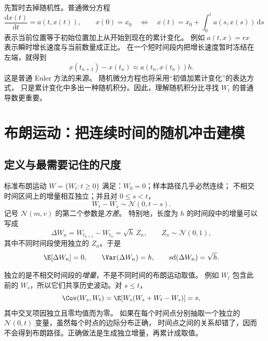 先暂时去掉随机性。普通微分方程
\begin{equation}
  \frac{\mathrm dx(t)}{\mathrm dt}=a(t,x(t)),\qquad x(0)=x_0
  \quad\Longleftrightarrow\quad
  x(t)=x_0+\int_0^t a(s,x(s))\,\mathrm ds
  \label{bg:eq:ode}
\end{equation}
表示当前位置等于初始位置加上从开始到现在的累计变化。
例如 $a(t,x)=rx$ 表示瞬时增长速度与当前数量成正比。
在一个短时间段内把增长速度暂时冻结在左端，就得到
\begin{equation}
  x(t_{n+1})-x(t_n)\approx a(t_n,x(t_n))h.
  \label{bg:eq:ode-euler}
\end{equation}
这是普通 Euler 方法的来源。
随机微分方程也将采用“初值加累计变化”的表达方式，
只是累计变化中多出一种随机积分。因此，理解随机积分比寻找 $W_t$ 的普通导数更重要。

\section{布朗运动：把连续时间的随机冲击建模}
\label{bg:sec:brownian}

\subsection{定义与最需要记住的尺度}
\label{bg:sub:brownian-definition}

标准布朗运动 $W=\{W_t:t\geq0\}$ 满足：$W_0=0$；样本路径几乎必然连续；
不相交时间区间上的增量相互独立；并且对 $0\leq s<t$，
\begin{equation}
  W_t-W_s\sim\mathcal N(0,t-s).
  \label{bg:eq:brownian-increment}
\end{equation}
记号 $\mathcal N(m,v)$ 的第二个参数是\emph{方差}。
特别地，长度为 $h$ 的时间段中的增量可以写成
\begin{equation}
  \Delta W_n=W_{t_{n+1}}-W_{t_n}=\sqrt h\,Z_n,
  \qquad Z_n\sim\mathcal N(0,1),
  \label{bg:eq:normal-scaling}
\end{equation}
其中不同时间段使用独立的 $Z_n$。于是
\begin{equation}
  \E[\Delta W_n]=0,\qquad
  \Var(\Delta W_n)=h,\qquad
  \operatorname{sd}(\Delta W_n)=\sqrt h.
  \label{bg:eq:increment-moments}
\end{equation}

独立的是不相交时间段的\emph{增量}，不是不同时间的布朗运动取值。
例如 $W_t$ 包含此前的 $W_s$，所以它们共享历史波动。对 $s\leq t$，
\begin{equation}
  \Cov(W_s,W_t)=\E[W_s(W_s+W_t-W_s)]=s,
  \label{bg:eq:brownian-covariance}
\end{equation}
其中交叉项因独立且零均值而为零。
如果在每个时间点分别抽取一个独立的 $\mathcal N(0,t)$ 变量，虽然每个时点的边际分布正确，
时间点之间的关系却错了，因而不会得到布朗路径。正确做法是生成独立增量，再累计成取值。

